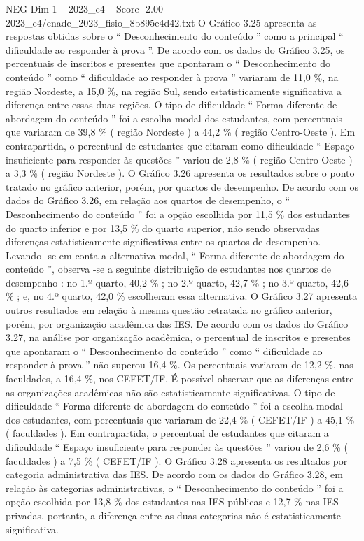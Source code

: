 \begin{textsample}{NEG Dim 1 – 2023\_c4 – Score -2.00 – 2023\_c4/enade\_2023\_fisio\_8b895e4d42.txt}
O Gráfico 3.25 apresenta as respostas obtidas sobre o “ Desconhecimento do conteúdo ” como a principal “ dificuldade ao responder à prova ”.
De acordo com os dados do Gráfico 3.25, os percentuais de inscritos e presentes que apontaram o “ Desconhecimento do conteúdo ” como “ dificuldade ao responder à prova ” variaram de 11,0 \%, na região Nordeste, a 15,0 \%, na região Sul, sendo estatisticamente significativa a diferença entre essas duas regiões.
O tipo de dificuldade “ Forma diferente de abordagem do conteúdo ” foi a escolha modal dos estudantes, com percentuais que variaram de 39,8 \% ( região Nordeste ) a 44,2 \% ( região Centro-Oeste ).
Em contrapartida, o percentual de estudantes que citaram como dificuldade “ Espaço insuficiente para responder às questões ” variou de 2,8 \% ( região Centro-Oeste ) a 3,3 \% ( região Nordeste ).
O Gráfico 3.26 apresenta os resultados sobre o ponto tratado no gráfico anterior, porém, por quartos de desempenho.
De acordo com os dados do Gráfico 3.26, em relação aos quartos de desempenho, o “ Desconhecimento do conteúdo ” foi a opção escolhida por 11,5 \% dos estudantes do quarto inferior e por 13,5 \% do quarto superior, não sendo observadas diferenças estatisticamente significativas entre os quartos de desempenho.
Levando -se em conta a alternativa modal, “ Forma diferente de abordagem do conteúdo ”, observa -se a seguinte distribuição de estudantes nos quartos de desempenho : no 1.º quarto, 40,2 \% ; no 2.º quarto, 42,7 \% ; no 3.º quarto, 42,6 \% ; e, no 4.º quarto, 42,0 \% escolheram essa alternativa.
O Gráfico 3.27 apresenta outros resultados em relação à mesma questão retratada no gráfico anterior, porém, por organização acadêmica das IES.
De acordo com os dados do Gráfico 3.27, na análise por organização acadêmica, o percentual de inscritos e presentes que apontaram o “ Desconhecimento do conteúdo ” como “ dificuldade ao responder à prova ” não superou 16,4 \%.
Os percentuais variaram de 12,2 \%, nas faculdades, a 16,4 \%, nos CEFET/IF.
É possível observar que as diferenças entre as organizações acadêmicas não são estatisticamente significativas.
O tipo de dificuldade “ Forma diferente de abordagem do conteúdo ” foi a escolha modal dos estudantes, com percentuais que variaram de 22,4 \% ( CEFET/IF ) a 45,1 \% ( faculdades ).
Em contrapartida, o percentual de estudantes que citaram a dificuldade “ Espaço insuficiente para responder às questões ” variou de 2,6 \% ( faculdades ) a 7,5 \% ( CEFET/IF ).
O Gráfico 3.28 apresenta os resultados por categoria administrativa das IES.
De acordo com os dados do Gráfico 3.28, em relação às categorias administrativas, o “ Desconhecimento do conteúdo ” foi a opção escolhida por 13,8 \% dos estudantes nas IES públicas e 12,7 \% nas IES privadas, portanto, a diferença entre as duas categorias não é estatisticamente significativa.

\end{textsample}
